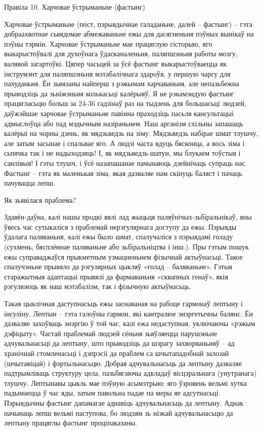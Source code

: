 Правіла 10. Харчовае ўстрыманьне (фастынг)

Харчовае ўстрыманьне (пост, пэрыядычнае галаданьне, далей – фастынг) – гэта добраахвотнае сьвядомае абмежаваньне ежы для дасягненьня пэўных вынікаў на пэўны тэрмін. Харчовае ўстрыманьне мае працяглую гісторыю, яго выкарыстоўвалі для духоўнага ўдасканаленьня, паляпшэньня работы мозгу, валявой загартоўкі. Цяпер часьцей за ўсё фастынг выкарыстоўваецца як інструмэнт для паляпшэньня мэтабалічнага здароўя, у першую чаргу для пахуданьня. Ён зьвязаны найперш з рэжымам харчаваньня, але непазьбежна прыводзіць да зьніжэньня колькасьці калёрыяў. Я не рэкамэндую фастынг працягласьцю больш за 24-36 гадзінаў раз на тыдзень для большасьці людзей, даўжэйшае харчовае ўстрыманьне павінна праходзіць пасьля кансультацыі адмыслоўца або пад мэдычным назіраньнем.
Наш арганізм схільны запашаць калёрыі на чорны дзень, як мядзьведзь на зіму. Мядзьведзь набірае шмат тлушчу, але затым засынае і спальвае яго. А людзі часта ядуць бясконца, а вось зіма і сьпячка так і не надыходзяць! І, як мядзьведзь-шатун, мы блукаем тоўстыя і санлівыя! І гэты тлушч, і ўсё назапашанае пачынаюць дзейнічаць супраць нас. Фастынг – гэта як маленькая зіма, якая дазваляе нам скінуць баляст і пачаць пачувацца лепш.

Як зьявілася праблема?

Здавён-даўна, калі нашы продкі вялі лад жыцьця паляўнічых-зьбіральнікаў, яны ўвесь час сутыкаліся з праблемай нерэгулярнага доступу да ежы. Пэрыяды ўдалага паляваньня, калі ежы было шмат, спалучаліся з пэрыядамі голаду (сухмень, бясплённае паляваньне або зьбіральніцтва і інш.). Пры гэтым пошук ежы суправаджаўся прыкметным узмацненьнем фізычнай актыўнасьці. Такое спалучэньне прывяло да рэгулярных цыкляў «голад – баляваньне». Гэтыя старажытныя адаптацыі прывялі да фармаваньня «сквапных генаў», якія рэгулююць як наш мэтабалізм, так і фізычную актыўнасьць.

Такая цыклічная даступнасьць ежы заснаваная на рабоце гармонаў лептыну і інсуліну. Лептын – гэта галоўны гармон, які кантралюе энэргетычны балянс. Ён дазваляе захоўваць энэргію ў той час, калі ежа недаступная, уключаючы «рэжым дэфіцыту». Частай праблемай людзей сёньня зьяўляецца парушэньне адчувальнасьці да лептыну, што прыводзіць да шэрагу захворваньняў – ад хранічнай стомленасьці і дэпрэсіі да праблем са шчытападобнай залозай (шчытавіцай) і фэртыльнасьцю. Добрая адчувальнасьць да лептыну дазваляе падтрымліваць структуру цела, пазьбягаючы адкладаў вісцэральнага (унутранага) тлушчу. Лептынавы цыкль мае пэўную асымэтрыю: яго ўзровень вельмі хутка падымаецца ў час яды, затым павольна падае па меры яе адсутнасьці. Пэрыядычны фастынг дапамагае аднавіць адчувальнасьць да лептыну. Аднак пачынаць лепш вельмі паступова, бо людзям зь нізкай адчувальнасьцю да лептыну працяглы фастынг проціпаказаны.


